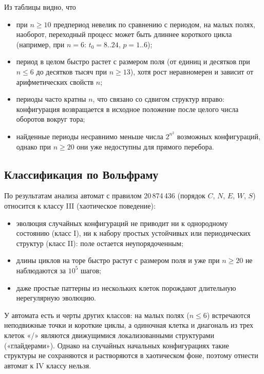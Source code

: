 Из таблицы видно, что
\begin{itemize}
	\item при $n \ge 10$ предпериод невелик по сравнению с периодом, на малых полях, наоборот, переходный процесс может быть длиннее короткого цикла (например, при $n = 6$: $t_0 = 8..24$, $p = 1..6$);
	\item период в целом быстро растет с размером поля (от единиц и десятков при $n \le 6$ до десятков тысяч при $n \ge 13$), хотя рост неравномерен и зависит от арифметических свойств $n$;
	\item периоды часто кратны $n$, что связано со сдвигом структур вправо: конфигурация возвращается в исходное положение после целого числа оборотов вокруг тора;
	\item найденные периоды несравнимо меньше числа $2^{n^2}$ возможных конфигураций, однако при $n \ge 20$ они уже недоступны для прямого перебора.
\end{itemize}

\subsection{Классификация по Вольфраму}

По результатам анализа автомат с правилом 20\,874\,436 (порядок $C$, $N$, $E$, $W$, $S$) относится к {классу III} (хаотическое поведение):
\begin{itemize}
	\item эволюция случайных конфигураций не приводит ни к однородному состоянию (класс I), ни к набору простых устойчивых или периодических структур (класс II): поле остается неупорядоченным;
	\item длины циклов на торе быстро растут с размером поля и уже при $n \ge 20$ не наблюдаются за $10^5$ шагов;
	\item даже простые паттерны из нескольких клеток порождают длительную нерегулярную эволюцию.
\end{itemize}

У автомата есть и черты других классов: на малых полях ($n \le 6$) встречаются неподвижные точки и короткие циклы, а одиночная клетка и диагональ из трех клеток «/» являются движущимися локализованными структурами («глайдерами»). Однако на случайных начальных конфигурациях такие структуры не сохраняются и растворяются в хаотическом фоне, поэтому отнести автомат к IV классу нельзя.
